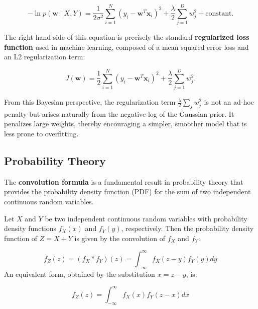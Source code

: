 \documentclass[../main.tex]{subfiles}
\begin{document}
\begin{equation*}
-\ln p(\mathbf{w} \mid X, Y) = \frac{1}{2\sigma^2} \sum_{i=1}^{N} \left(y_i - \mathbf{w}^T \mathbf{x}_i \right)^2 + \frac{\lambda}{2} \sum_{j=1}^{D} w_j^2 + \text{constant}.
\end{equation*}

The right-hand side of this equation is precisely the standard \textbf{regularized loss function} used in machine learning, composed of a mean squared error loss and an L2 regularization term:

\begin{equation*}
J(\mathbf{w}) = \frac{1}{2} \sum_{i=1}^{N} \left(y_i - \mathbf{w}^T \mathbf{x}_i \right)^2 + \frac{\lambda}{2} \sum_{j=1}^{D} w_j^2.
\end{equation*}

From this Bayesian perspective, the regularization term $\frac{\lambda}{2} \sum_j w_j^2$ is not an ad-hoc penalty but arises naturally from the negative log of the Gaussian prior. It penalizes large weights, thereby encouraging a simpler, smoother model that is less prone to overfitting.

\subsection{Probability Theory}

\noindent The \textbf{convolution formula} is a fundamental result in probability theory that provides the probability density function (PDF) for the sum of two independent continuous random variables.

\begin{yellow}
\begin{theorem}
    
Let $X$ and $Y$ be two independent continuous random variables with probability density functions $f_X(x)$ and $f_Y(y)$, respectively. Then the probability density function of $Z = X + Y$ is given by the convolution of $f_X$ and $f_Y$:

\begin{equation*}
f_Z(z) = (f_X * f_Y)(z) = \int_{-\infty}^{\infty} f_X(z - y) f_Y(y)  dy
\end{equation*}
An equivalent form, obtained by the substitution $x = z - y$, is:

\begin{equation*}
f_Z(z) = \int_{-\infty}^{\infty} f_X(x) f_Y(z - x)  dx
\end{equation*}


\end{theorem}
\end{yellow}
\end{document}
